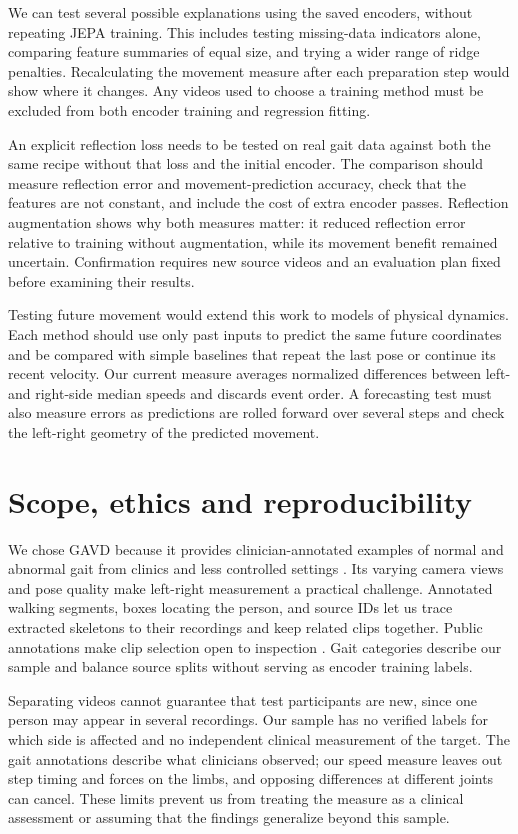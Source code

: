 \documentclass{article}
\begin{document}
We can test several possible explanations using the saved encoders, without repeating JEPA training. This includes testing missing-data indicators alone, comparing feature summaries of equal size, and trying a wider range of ridge penalties. Recalculating the movement measure after each preparation step would show where it changes. Any videos used to choose a training method must be excluded from both encoder training and regression fitting.

An explicit reflection loss needs to be tested on real gait data against both the same recipe without that loss and the initial encoder. The comparison should measure reflection error and movement-prediction accuracy, check that the features are not constant, and include the cost of extra encoder passes. Reflection augmentation shows why both measures matter: it reduced reflection error relative to training without augmentation, while its movement benefit remained uncertain. Confirmation requires new source videos and an evaluation plan fixed before examining their results.

Testing future movement would extend this work to models of physical dynamics. Each method should use only past inputs to predict the same future coordinates and be compared with simple baselines that repeat the last pose or continue its recent velocity. Our current measure averages normalized differences between left- and right-side median speeds and discards event order. A forecasting test must also measure errors as predictions are rolled forward over several steps and check the left-right geometry of the predicted movement.

\section{Scope, ethics and reproducibility}\label{scope-ethics-and-reproducibility}

We chose GAVD because it provides clinician-annotated examples of normal and abnormal gait from clinics and less controlled settings \citep{ref13}. Its varying camera views and pose quality make left-right measurement a practical challenge. Annotated walking segments, boxes locating the person, and source IDs let us trace extracted skeletons to their recordings and keep related clips together. Public annotations make clip selection open to inspection \citep{ref15}. Gait categories describe our sample and balance source splits without serving as encoder training labels.

Separating videos cannot guarantee that test participants are new, since one person may appear in several recordings. Our sample has no verified labels for which side is affected and no independent clinical measurement of the target. The gait annotations describe what clinicians observed; our speed measure leaves out step timing and forces on the limbs, and opposing differences at different joints can cancel. These limits prevent us from treating the measure as a clinical assessment or assuming that the findings generalize beyond this sample.
\end{document}
